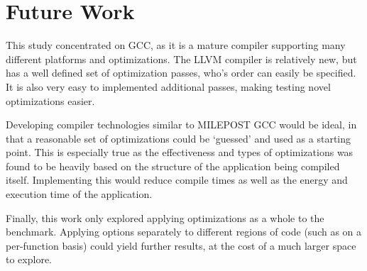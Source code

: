 \documentclass[twocolumn]{article}
\begin{document}
\section*{Future Work}

This study concentrated on GCC, as it is a mature compiler supporting many different platforms and optimizations. The LLVM compiler is relatively new, but has a well defined set of optimization passes, who's order can easily be specified. It is also very easy to implemented additional passes, making testing novel optimizations easier.

Developing compiler technologies similar to MILEPOST GCC would be ideal, in that a reasonable set of optimizations could be `guessed' and used as a starting point. This is especially true as the effectiveness and types of optimizations was found to be heavily based on the structure of the application being compiled itself. Implementing this would reduce compile times as well as the energy and execution time of the application.

Finally, this work only explored applying optimizations as a whole to the benchmark. Applying options separately to different regions of code (such as on a per-function basis) could yield further results, at the cost of a much larger space to explore.



\printbibliography
\end{document}

